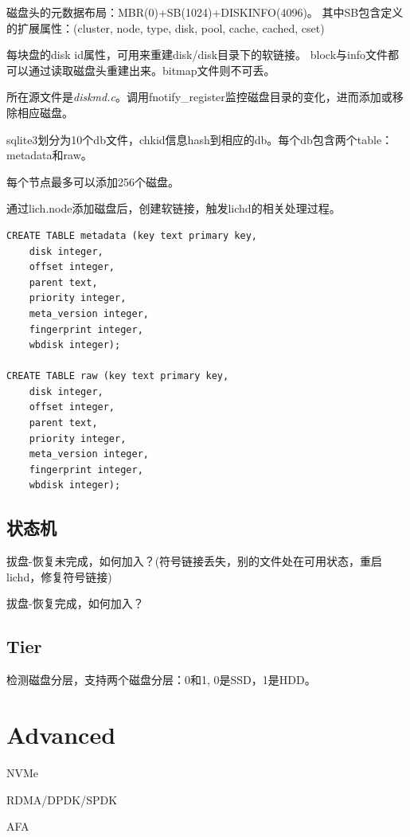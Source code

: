 磁盘头的元数据布局：MBR(0)+SB(1024)+DISKINFO(4096)。
其中SB包含定义的扩展属性：(cluster, node, type, disk, pool, cache, cached, cset)

每块盘的disk id属性，可用来重建disk/disk目录下的软链接。
block与info文件都可以通过读取磁盘头重建出来。bitmap文件则不可丢。

所在源文件是\emph{diskmd.c}。调用fnotify\_register监控磁盘目录的变化，进而添加或移除相应磁盘。

sqlite3划分为10个db文件，chkid信息hash到相应的db。每个db包含两个table：metadata和raw。

每个节点最多可以添加256个磁盘。

通过lich.node添加磁盘后，创建软链接，触发lichd的相关处理过程。

\begin{lstlisting}[frame=single]
CREATE TABLE metadata (key text primary key,
    disk integer,
    offset integer,
    parent text,
    priority integer,
    meta_version integer,
    fingerprint integer,
    wbdisk integer);

CREATE TABLE raw (key text primary key,
    disk integer,
    offset integer,
    parent text,
    priority integer,
    meta_version integer,
    fingerprint integer,
    wbdisk integer);
\end{lstlisting}

\subsection{状态机}

拔盘-恢复未完成，如何加入？(符号链接丢失，别的文件处在可用状态，重启lichd，修复符号链接)

拔盘-恢复完成，如何加入？

\subsection{Tier}

检测磁盘分层，支持两个磁盘分层：0和1, 0是SSD，1是HDD。

\section{Advanced}

NVMe

RDMA/DPDK/SPDK

AFA
